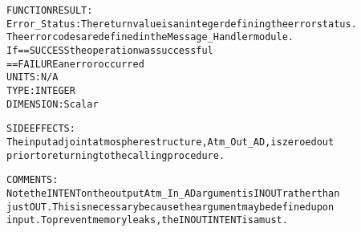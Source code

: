 \begin{alltt}
  FUNCTION RESULT:
        Error_Status:    The return value is an integer defining the error status.
                         The error codes are defined in the Message_Handler module.
                         If == SUCCESS the operation was successful
                            == FAILURE an error occurred
                         UNITS:      N/A
                         TYPE:       INTEGER
                         DIMENSION:  Scalar
 
  SIDE EFFECTS:
        The input adjoint atmosphere structure, Atm_Out_AD, is zeroed out
        prior to returning to the calling procedure.
 
  COMMENTS:
        Note the INTENT on the output Atm_In_AD argument is IN OUT rather than
        just OUT. This is necessary because the argument may be defined upon
        input. To prevent memory leaks, the IN OUT INTENT is a must.
 
  \end{alltt}
